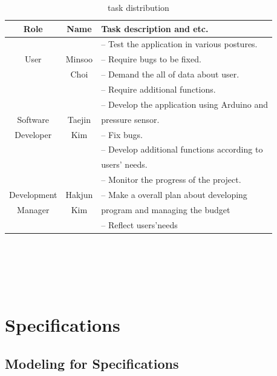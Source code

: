 \documentclass[conference]{IEEEtran}
\begin{document}
\begin{table}[H]
\caption{task distribution}
\begin{tabular}{|c|c|l|}\hline
Role & Name & Task description and etc.\\ \hline \hline

&  &  -- Test the application in various postures. \\ 

User & Minsoo & -- Require bugs to be fixed.  \\ 

& Choi & -- Demand the all of data about user. \\ 

&  & -- Require additional functions. \\ \hline

&  &  -- Develop the application using Arduino and\\ 

Software & Taejin & pressure sensor. \\ 

Developer & Kim & -- Fix bugs. \\ 

&  & -- Develop additional functions according to\\ 

&  & users' needs. \\ \hline

&  &  -- Monitor the progress of the project. \\ 

Development & Hakjun & -- Make a overall plan about developing \\ 

Manager& Kim & program and managing the budget \\ 

&  & -- Reflect users'needs \\ \hline

\end{tabular}\\\\\\\\

\end{table}

\section{Specifications}

\subsection{Modeling for Specifications \\}
\end{document}
